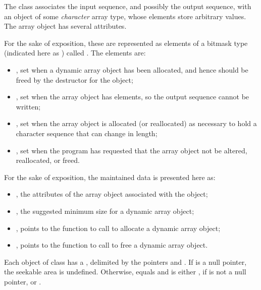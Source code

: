 \pnum
The class
associates the input sequence, and possibly the output sequence, with an object of some
\textit{character}
array type, whose elements store arbitrary values.
The array object has several attributes.

\pnum
\begin{note}
For the sake of exposition, these are represented as elements of a bitmask type
(indicated here as ) called .
The elements are:
\begin{itemize}
\item
{}, set when a dynamic array object has been
allocated, and hence should be freed by the destructor for the
 object;
\item
{}, set when the array object has
 elements, so the output sequence cannot be written;
\item
{}, set when the array object is allocated
(or reallocated)
as necessary to hold a character sequence that can change in length;
\item
{}, set when the program has requested that the
array object not be altered, reallocated, or freed.
\end{itemize}
\end{note}

\pnum
\begin{note}
For the sake of exposition, the maintained data is presented here as:
\begin{itemize}
\item
{}, the attributes of the array object
associated with the  object;
\item
{}, the suggested minimum size for a
dynamic array object;
\item
{}, points to the function
to call to allocate a dynamic array object;
\item
{}, points to the function to
call to free a dynamic array object.
\end{itemize}
\end{note}

\pnum
Each object of class
has a
,
delimited by the pointers  and .
If  is a null pointer, the seekable area is undefined.
Otherwise,  equals  and
 is either ,
if  is not a null pointer, or .

